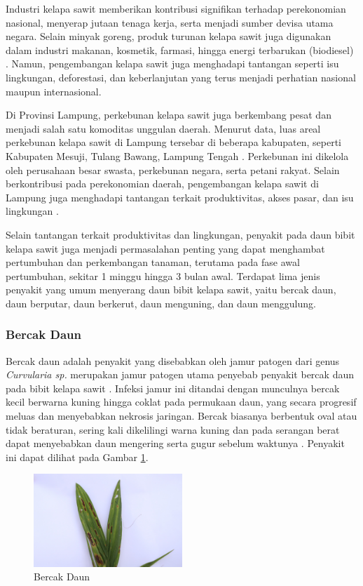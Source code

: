 Industri kelapa sawit memberikan kontribusi signifikan terhadap perekonomian nasional, menyerap jutaan tenaga kerja, serta menjadi sumber devisa utama negara. Selain minyak goreng, produk turunan kelapa sawit juga digunakan dalam industri makanan, kosmetik, farmasi, hingga energi terbarukan (biodiesel) \cite{christian2019industri}. Namun, pengembangan kelapa sawit juga menghadapi tantangan seperti isu lingkungan, deforestasi, dan keberlanjutan yang terus menjadi perhatian nasional maupun internasional.

Di Provinsi Lampung, perkebunan kelapa sawit juga berkembang pesat dan menjadi salah satu komoditas unggulan daerah. Menurut data, luas areal perkebunan kelapa sawit di Lampung tersebar di beberapa kabupaten, seperti Kabupaten Mesuji, Tulang Bawang, Lampung Tengah \cite{kurniasih2021sistem}. Perkebunan ini dikelola oleh perusahaan besar swasta, perkebunan negara, serta petani rakyat. Selain berkontribusi pada perekonomian daerah, pengembangan kelapa sawit di Lampung juga menghadapi tantangan terkait produktivitas, akses pasar, dan isu lingkungan \cite{muflihani2024analisis}.

Selain tantangan terkait produktivitas dan lingkungan, penyakit pada daun bibit kelapa sawit juga menjadi permasalahan penting yang dapat menghambat pertumbuhan dan perkembangan tanaman, terutama pada fase awal pertumbuhan, sekitar 1 minggu hingga 3 bulan awal. Terdapat lima jenis penyakit yang umum menyerang daun bibit kelapa sawit, yaitu bercak daun, daun berputar, daun berkerut, daun menguning, dan daun menggulung.

\subsubsection{Bercak Daun} \label{II.Bercak Daun}
Bercak daun adalah penyakit yang disebabkan oleh jamur patogen dari genus
\textit{Curvularia sp.} merupakan jamur patogen utama penyebab penyakit bercak daun pada bibit kelapa sawit \cite{lalang2016inventarisasi}\cite{suhesti2022analisis}. Infeksi jamur ini ditandai dengan munculnya bercak kecil berwarna kuning hingga coklat pada permukaan daun, yang secara progresif meluas dan menyebabkan nekrosis jaringan. Bercak biasanya berbentuk oval atau tidak beraturan, sering kali dikelilingi warna kuning dan pada serangan berat dapat menyebabkan daun mengering serta gugur sebelum waktunya \cite{agustina2019rapid}. Penyakit ini dapat dilihat pada Gambar \ref{fig:2.Bercak Daun}.

\begin{figure}[H]
	\centering
	\includegraphics[width=0.5\textwidth]{figure/chapter-2-bercak-daun.jpg}
	\caption{Bercak Daun}
	\label{fig:2.Bercak Daun}
\end{figure}

